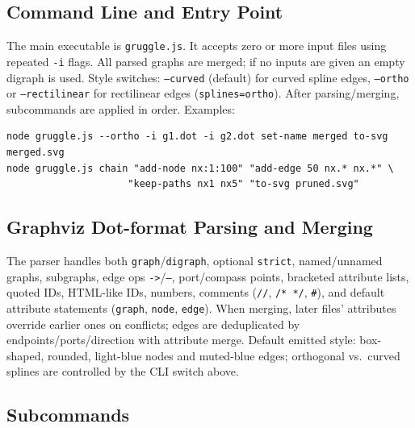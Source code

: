 \documentclass[11pt]{article}
\begin{document}
\subsection{Command Line and Entry Point}

The main executable is \texttt{gruggle.js}. It accepts zero or more input files using repeated \texttt{-i} flags. All parsed graphs are merged; if no inputs are given an empty digraph is used. Style switches: \texttt{--curved} (default) for curved spline edges, \texttt{--ortho} or \texttt{--rectilinear} for rectilinear edges (\texttt{splines=ortho}). After parsing/merging, subcommands are applied in order. Examples:
\begin{verbatim}
node gruggle.js --ortho -i g1.dot -i g2.dot set-name merged to-svg merged.svg
node gruggle.js chain "add-node nx:1:100" "add-edge 50 nx.* nx.*" \
                     "keep-paths nx1 nx5" "to-svg pruned.svg"
\end{verbatim}

\subsection{Graphviz Dot-format Parsing and Merging}

The parser handles both \texttt{graph}/\texttt{digraph}, optional \texttt{strict}, named/unnamed graphs, subgraphs, edge ops \texttt{->}/\texttt{--}, port/compass points, bracketed attribute lists, quoted IDs, HTML-like IDs, numbers, comments (\texttt{//}, \texttt{/* */}, \texttt{\#}), and default attribute statements (\texttt{graph}, \texttt{node}, \texttt{edge}). When merging, later files' attributes override earlier ones on conflicts; edges are deduplicated by endpoints/ports/direction with attribute merge. Default emitted style: box-shaped, rounded, light-blue nodes and muted-blue edges; orthogonal vs.\ curved splines are controlled by the CLI switch above.

\subsection{Subcommands}
\end{document}
